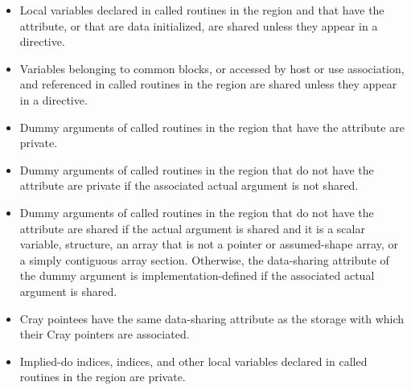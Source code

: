 \begin{fortranspecific}
\begin{itemize}
\item Local variables declared in called routines in the region and that have the 
attribute, or that are data initialized, are shared unless they appear in a
 directive.

\item Variables belonging to common blocks, or accessed by host or use association, and referenced in called routines in the region are shared unless they appear in a  directive.

\item Dummy arguments of called routines in the region that have the
     attribute are private.

\item Dummy arguments of called routines in the region that do not have the
     attribute are private if the associated actual argument is not
    shared.

\item Dummy arguments of called routines in the region that do not have the
 attribute are shared if the actual argument is shared and it
is a scalar variable, structure, an array that is not a pointer or
assumed-shape array, or a simply contiguous array section.  Otherwise, the
data-sharing attribute of the dummy argument is implementation-defined if
the associated actual argument is shared.

\item Cray pointees have the same data-sharing attribute as the storage with which their Cray pointers are associated.

\item Implied-do indices,  indices, and other local variables declared in called
routines in the region are private.
\end{itemize}
\end{fortranspecific}
%
%
%
%
%
%
%
%
%
